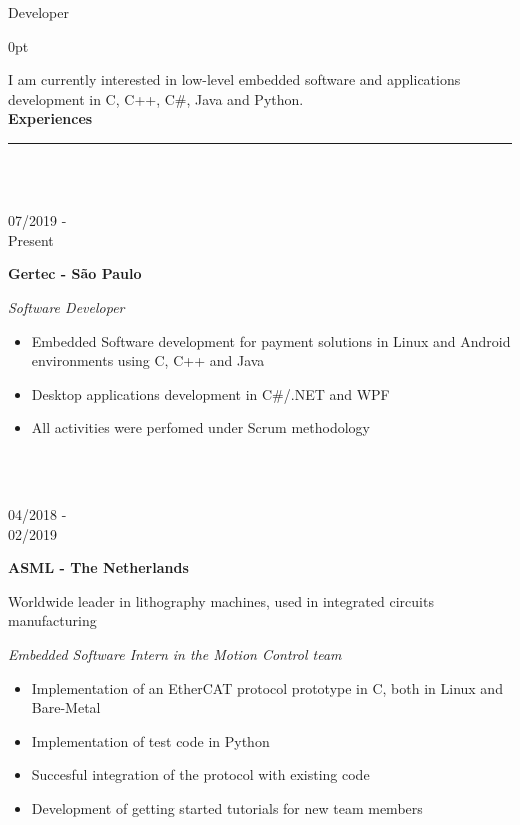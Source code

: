 \documentclass[a4paper]{article}
\begin{document}
	\LARGE Developer
	\vspace{12.5pt}
	\begin{adjustwidth}{\parindent}{0pt}
	\begin{minipage}[t]{0.65\textwidth}
	\large I am currently interested in low-level embedded software and applications development in C, C++, C\#, Java and Python.\\

  \Large{\textbf{Experiences}} \normalsize \\ \rule{\textwidth}{0.5pt} \\ \\
  
  \begin{minipage}[t]{0.2\textwidth}
    \large{07/2019 - \\ Present}
    \end{minipage}
    \begin{minipage}[t]{0.8\textwidth}
    {
      \setlength{\parskip}{5.5pt}
      \Large{\textbf{Gertec - São Paulo}}
    
      \large{\textit{Software Developer}}
      \begin{itemize}
        \item \normalsize{Embedded Software development for payment solutions in Linux and Android environments using C, C++ and Java}
        \item \normalsize{Desktop applications development in C\#/.NET and WPF}
        \item \normalsize{All activities were perfomed under Scrum methodology}
      \end{itemize}
    }
  \end{minipage} \\ \\

	\begin{minipage}[t]{0.2\textwidth}
	\large{04/2018 - \\ 02/2019}
	\end{minipage}
	\begin{minipage}[t]{0.8\textwidth}
	{
	  \setlength{\parskip}{5.5pt}
	  \Large{\textbf{ASML - The Netherlands}}
	  
	  \large{Worldwide leader in lithography machines, used in integrated circuits manufacturing}
	  
	  \large{\textit{Embedded Software Intern in the Motion Control team}}
	  \begin{itemize}
	    \item \normalsize{Implementation of an EtherCAT protocol prototype in C, both in Linux and Bare-Metal}
	    \item \normalsize{Implementation of test code in Python}
	    \item \normalsize{Succesful integration of the protocol with existing code}
	    \item \normalsize{Development of getting started tutorials for new team members}
	  \end{itemize}
	}
\end{minipage} \\ \\


\end{minipage}
\end{adjustwidth}
\end{document}
